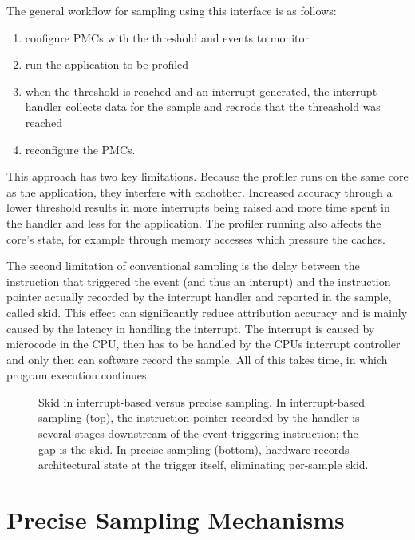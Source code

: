 The general workflow for sampling using this interface is as follows:
\begin{enumerate}[label=\Alph*)]
    \item configure PMCs with the threshold and events to monitor
    \item run the application to be profiled
    \item when the threshold is reached and an interrupt generated, the interrupt handler collects data for the sample and recrods that the threashold was reached
    \item reconfigure the PMCs.
\end{enumerate}

This approach has two key limitations. Because the profiler runs on the same core as the application, they interfere with eachother. Increased accuracy through a lower threshold results in more interrupts being raised and more time spent in the handler and less for the application. The profiler running also affects the core's state, for example through memory accesses which pressure the caches.

The second limitation of conventional sampling is the delay between the instruction that triggered the event (and thus an interupt) and the instruction pointer actually recorded by the interrupt handler and reported in the sample, called skid. This effect can significantly reduce attribution accuracy and is mainly caused by the latency in handling the interrupt\cite{VtuneManual}. The interrupt is caused by microcode in the CPU, then has to be handled by the CPUs interrupt controller and only then can software record the sample. All of this takes time, in which program execution continues.\cite{VtuneManual,uProfGetStarted}

\begin{figure}[t]
    \centering
    
    \caption[Skid in interrupt-based versus precise sampling.]{Skid in interrupt-based versus precise sampling. In interrupt-based sampling (top), the instruction pointer recorded by the handler is several stages downstream of the event-triggering instruction; the gap is the skid. In precise sampling (bottom), hardware records architectural state at the trigger itself, eliminating per-sample skid.}
    \label{fig:skid-timeline}
\end{figure}

\section{Precise Sampling Mechanisms}
\label{sec:precise-sampling}

